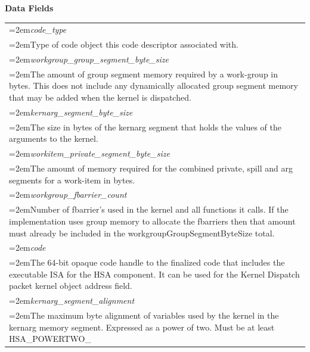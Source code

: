 \documentclass[final,oneside]{book}
\newcommand{\reffld}[1]{\textit{#1}}
\begin{document}
\noindent\textbf{Data Fields}\\[-6mm]
\begin{longtable}{@{}>{\hangindent=2em}p{\textwidth}}
\hypertarget{hsa_\-ext_\-code_\-descriptor_\-t.code_\-type}{\reffld{code_\-type}}\\\hspace{2em}Type of code object this code descriptor associated with.\\[2mm]
\hypertarget{hsa_\-ext_\-code_\-descriptor_\-t.workgroup_\-group_\-segment_\-byte_\-size}{\reffld{workgroup_\-group_\-segment_\-byte_\-size}}\\\hspace{2em}The amount of group segment memory required by a work-group in bytes. This does not include any dynamically allocated group segment memory that may be added when the kernel is dispatched.\\[2mm]
\hypertarget{hsa_\-ext_\-code_\-descriptor_\-t.kernarg_\-segment_\-byte_\-size}{\reffld{kernarg_\-segment_\-byte_\-size}}\\\hspace{2em}The size in bytes of the kernarg segment that holds the values of the arguments to the kernel.\\[2mm]
\hypertarget{hsa_\-ext_\-code_\-descriptor_\-t.workitem_\-private_\-segment_\-byte_\-size}{\reffld{workitem_\-private_\-segment_\-byte_\-size}}\\\hspace{2em}The amount of memory required for the combined private, spill and arg segments for a work-item in bytes.\\[2mm]
\hypertarget{hsa_\-ext_\-code_\-descriptor_\-t.workgroup_\-fbarrier_\-count}{\reffld{workgroup_\-fbarrier_\-count}}\\\hspace{2em}Number of fbarrier's used in the kernel and all functions it calls. If the implementation uses group memory to allocate the fbarriers then that amount must already be included in the workgroupGroupSegmentByteSize total.\\[2mm]
\hypertarget{hsa_\-ext_\-code_\-descriptor_\-t.code}{\reffld{code}}\\\hspace{2em}The 64-bit opaque code handle to the finalized code that includes the executable ISA for the HSA component. It can be used for the Kernel Dispatch packet kernel object address field.\\[2mm]
\hypertarget{hsa_\-ext_\-code_\-descriptor_\-t.kernarg_\-segment_\-alignment}{\reffld{kernarg_\-segment_\-alignment}}\\\hspace{2em}The maximum byte alignment of variables used by the kernel in the kernarg memory segment. Expressed as a power of two. Must be at least HSA_\-POWERTWO_\-16\\[2mm]

\end{longtable}
\end{document}
